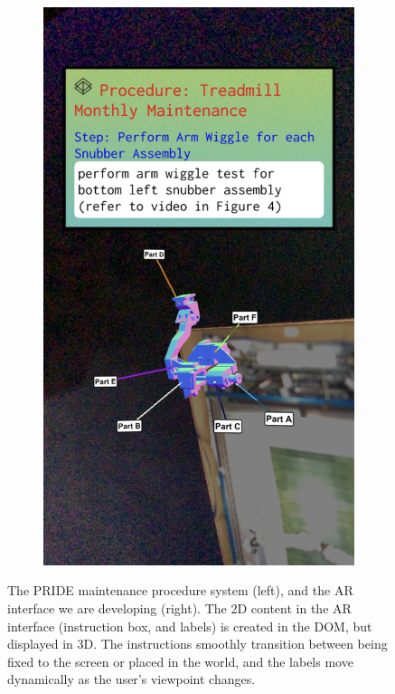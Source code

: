 \documentclass[sigconf]{acmart}
\begin{document}
\begin{figure}[h]
\begin{subfigure}{0.33\linewidth}
    \includegraphics[width=\linewidth]{PRIDE-AR.jpeg}
    \end{subfigure}
  \caption{The PRIDE maintenance procedure system (left), and the AR interface we are developing (right). The 2D content in the AR interface (instruction box, and labels) is created in the DOM, but displayed in 3D.  The instructions smoothly transition between being fixed to the screen or placed in the world, and the labels move dynamically as the user's viewpoint changes.}
  \Description{}
  \label{fig:pride}
\end{figure}
\end{document}
